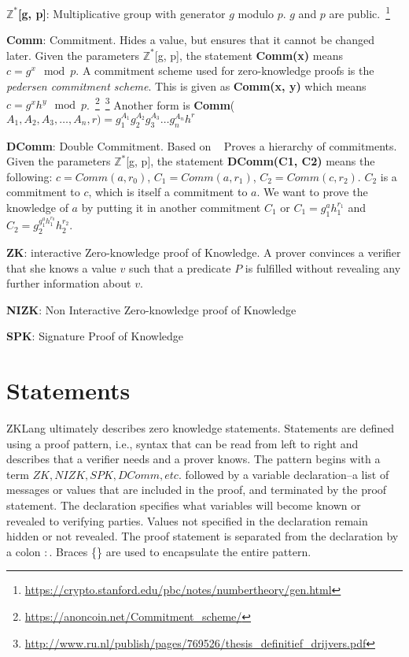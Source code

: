 \documentclass[a4paper]{article}
\begin{document}
$\mathbb{Z^*}$\textbf{[g, p]}: Multiplicative group with generator $g$ modulo $p$. $g$ and $p$ are public.~\footnote{\url{https://crypto.stanford.edu/pbc/notes/numbertheory/gen.html}}\newline

\textbf{Comm}: Commitment. Hides a value, but ensures that it cannot be changed later. Given the parameters $\mathbb{Z^*}$[g, p], the statement \textbf{Comm(x)} means  $c=g^x\mod{p}$. A commitment scheme used for zero-knowledge proofs is the \emph{pedersen commitment scheme}. This is given as \textbf{Comm(x, y)} which means $c=g^xh^y\mod{p}$.~\footnote{\url{https://anoncoin.net/Commitment_scheme/}}~\footnote{\url{http://www.ru.nl/publish/pages/769526/thesis_definitief_drijvers.pdf}} Another form is \textbf{Comm}($A_1, A_2, A_3, \dots, A_n, r)=g_1^{A_1} g_2^{A_2} g_3^{A_3}\dots g_n^{A_n} h^r$\newline

\textbf{DComm}: Double Commitment. Based on ~\cite{MiersG0R13} Proves a hierarchy of commitments. Given the parameters $\mathbb{Z^*}$[g, p], the statement \textbf{DComm(C1, C2)} means the following:
$c=Comm(a, r_0)$, $C_1=Comm(a, r_1)$, $C_2=Comm(c, r_2)$. $C_2$ is a commitment to $c$, which is itself a commitment to $a$. We want to prove the knowledge of $a$ by putting it in another commitment $C_1$ or $C_1 = g_1^a h_1^{r_1}$ and $C_2 = g_2^{g_1^{a} h_1^{r_0}} h_2^{r_2}$.\newline

\textbf{ZK}: interactive Zero-knowledge proof of Knowledge. A prover convinces a verifier that she knows a value $v$ such that a predicate $P$ is fulfilled without revealing any further information about $v$.\newline

\textbf{NIZK}: Non Interactive Zero-knowledge proof of Knowledge\newline

\textbf{SPK}: Signature Proof of Knowledge\newline

\section{Statements}
ZKLang ultimately describes zero knowledge statements. Statements are defined using a proof pattern, i.e., syntax that can be read from left to right and describes that a verifier needs and a prover knows. The pattern begins with a term $ZK, NIZK, SPK, DComm, etc.$ followed by a variable declaration--a list of messages or values that are included in the proof, and terminated by the proof statement. 
The declaration specifies what variables will become known or revealed to verifying parties. Values not specified in the declaration remain hidden or not revealed. The proof statement is separated from the declaration by a colon $:$. Braces \{\} are used to encapsulate the entire pattern.
\end{document}
